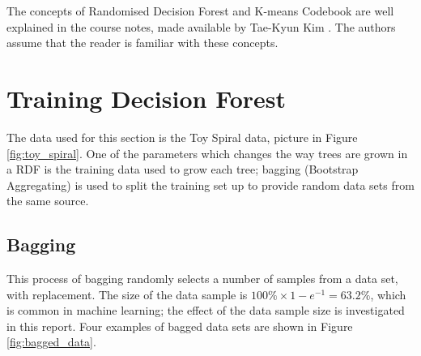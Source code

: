 \documentclass[a4paper, 10pt, conference]{ieeeconf}
\begin{document}
The concepts of Randomised Decision Forest and K-means Codebook are well explained in the course notes, made available by Tae-Kyun Kim \cite{notes}. The authors assume that the reader is familiar with these concepts.


\section{Training Decision Forest}

The data used for this section is the Toy Spiral data, picture in Figure \ref{fig:toy_spiral}. One of the parameters which changes the way trees are grown in a RDF is the training data used to grow each tree; bagging (Bootstrap Aggregating) is used to split the training set up to provide random data sets from the same source.

\subsection{Bagging}

This process of bagging randomly selects a number of samples from a data set, with replacement. The size of the data sample is $100\% \times 1-e^{-1}=63.2\%$, which is common in machine learning; the effect of the data sample size is investigated in this report. Four examples of bagged data sets are shown in Figure \ref{fig:bagged_data}.
\end{document}
